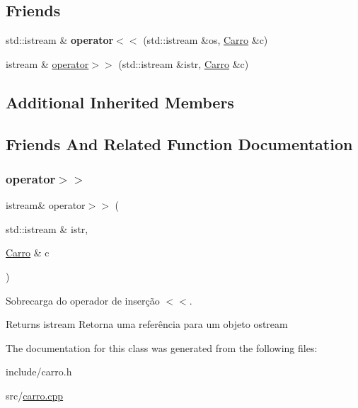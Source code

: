 \subsection*{Friends}
\begin{DoxyCompactItemize}
\item 
\mbox{\label{classCarro_a7a3158300c210309a0e2019ba0b67ec8}} 
std\+::istream \& {\bfseries operator$<$$<$} (std\+::istream \&os, \hyperlink{classCarro}{Carro} \&c)
\item 
istream \& \hyperlink{classCarro_a1fb1c0527d5cc52193fc304bc1646864}{operator$>$$>$} (std\+::istream \&istr, \hyperlink{classCarro}{Carro} \&c)
\end{DoxyCompactItemize}
\subsection*{Additional Inherited Members}


\subsection{Friends And Related Function Documentation}
\mbox{\label{classCarro_a1fb1c0527d5cc52193fc304bc1646864}} 
\subsubsection{\texorpdfstring{operator$>$$>$}{operator>>}}
{\footnotesize\ttfamily istream\& operator$>$$>$ (\begin{DoxyParamCaption}\item[{std\+::istream \&}]{istr,  }\item[{\hyperlink{classCarro}{Carro} \&}]{c }\end{DoxyParamCaption})\hspace{0.3cm}{\ttfamily [friend]}}

Sobrecarga do operador de inserção $<$$<$. \begin{DoxyReturn}{Returns}
istream Retorna uma referência para um objeto ostream 
\end{DoxyReturn}


The documentation for this class was generated from the following files\+:\begin{DoxyCompactItemize}
\item 
include/carro.\+h\item 
src/\hyperlink{carro_8cpp}{carro.\+cpp}\end{DoxyCompactItemize}
